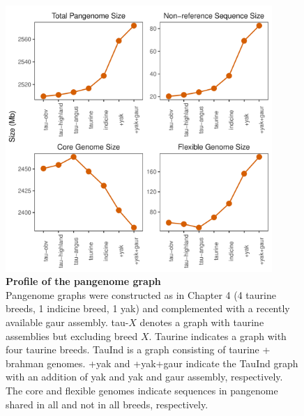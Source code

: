 \documentclass[../main.tex]{subfiles}
\begin{document}
\begin{figure}[!htb]
   \centering
   \includegraphics[width=0.9\textwidth]{discuss/fig51.pdf}
       \vspace{3mm}
       \caption[Profile of the pangenome graph]{\textbf{Profile of the pangenome graph} \\
       \footnotesize{Pangenome graphs were constructed as in Chapter 4 (4 taurine breeds, 1 indicine breed, 1 yak) and complemented with a recently available gaur assembly. tau-$X$ denotes a graph with taurine assemblies but excluding breed $X$. Taurine indicates a graph with four taurine breeds. TauInd is a graph consisting of taurine + brahman genomes. +yak and +yak+gaur indicate the TauInd graph with an addition of yak and yak and gaur assembly, respectively. The core and flexible genomes indicate sequences in pangenome shared in all and not in all breeds, respectively.
       }}
       \label{fig51:panchang}
\end{figure}
\end{document}
